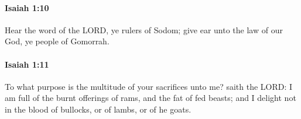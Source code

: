 		\paragraph{Isaiah 1:10} %
			\label{ISAIAH-1-10}

			Hear the word of the LORD, ye rulers of Sodom; give ear unto the law of our God, ye people of Gomorrah.


		\paragraph{Isaiah 1:11} %
			\label{ISAIAH-1-11}

			To what purpose is the multitude of your sacrifices unto me? saith the LORD: I am full of the burnt offerings of rams, and the fat of fed beasts; and I delight not in the blood of bullocks, or of lambs, or of he goats.



